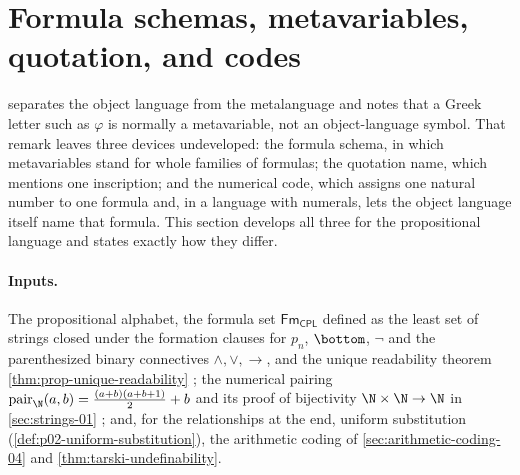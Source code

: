 \section{Formula schemas, metavariables, quotation, and codes}
\label{sec:p01-w02-p01-004-schemas-codes}

 separates the object language from the metalanguage and
notes that a Greek letter such as \(\varphi\) is normally a metavariable,
not an object-language symbol. That remark leaves three devices undeveloped:
the formula schema, in which metavariables stand for whole families of
formulas; the quotation name, which mentions one inscription; and the
numerical code, which assigns one natural number to one formula and, in a
language with numerals, lets the object language itself name that formula.
This section develops all three for the propositional language and states
exactly how they differ.

\paragraph{Inputs.} The propositional alphabet, the formula set
\(\mathsf{Fm}_{\mathsf{CPL}}\) defined as the least set of strings closed
under the formation clauses for \(p_n\), \(\bottom\), \(\neg\) and the
parenthesized binary connectives \(\land,\lor,\to\), and the unique
readability theorem \cref{thm:prop-unique-readability}
\cite[ch.~``Propositional Syntax and Semantics'', definitions
``Propositional alphabet'' and ``Propositional formula'', theorem ``Unique
readability'']{FrozenFormalLogicSchemasCodes}; the numerical pairing
\(\operatorname{pair}_{\N}(a,b)=\frac{(a+b)(a+b+1)}{2}+b\) and its proof of
bijectivity \(\N\times\N\to\N\) in \cref{sec:strings-01}
\cite[ch.~``Finite Strings, Induction, and Recursion'', section ``Finite
sequences and strings'']{FrozenFormalLogicSchemasCodes}; and, for the
relationships at the end, uniform substitution
(\cref{def:p02-uniform-substitution}), the arithmetic coding of
\cref{sec:arithmetic-coding-04} and \cref{thm:tarski-undefinability}.

